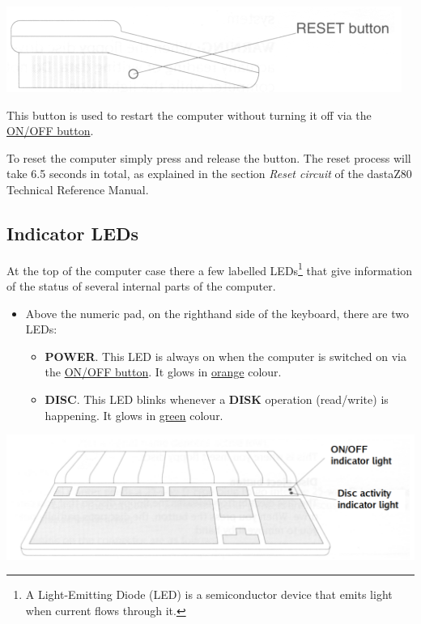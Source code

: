     \includegraphics[scale=0.7]{images/resetbutton.png}

    This button is used to restart the computer without turning it off via the
    \hyperref[subsec:onoffbutt]{ON/OFF button}.

    To reset the computer simply press and release the button. The reset process
    will take 6.5 seconds in total, as explained in the section
    \textit{Reset circuit} of the dastaZ80 Technical Reference
    Manual\cite{dastaz80techman}.

    \subsection{Indicator LEDs}

    At the top of the computer case there a few labelled LEDs\footnote{A
    Light-Emitting Diode (LED) is a semiconductor device that emits light when
    current flows through it.} that give information of the status of several
    internal parts of the computer.

    \begin{itemize}
        \item Above the numeric pad, on the righthand side of the keyboard,
        there are two LEDs:
        \begin{itemize}
            \item \textbf{POWER}. This LED is always on when the computer is
            switched on via the \hyperref[subsec:onoffbutt]{ON/OFF button}. It glows
            in \underline{orange} colour.
            \item \textbf{DISC}. This LED blinks whenever a \textbf{DISK} operation
            (read/write) is happening. It glows in \underline{green} colour.
        \end{itemize}
    \end{itemize}
    
    \centerline{\includegraphics[scale=0.5]{images/keyboardLEDs.png}}


